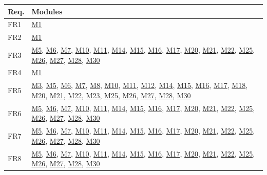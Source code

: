 \documentclass[12pt, titlepage]{article}
\begin{document}
\begin{table}[H]
\centering
\begin{tabular}{p{} p{}}
\toprule
\textbf{Req.} & \textbf{Modules}\\
\midrule
FR1 & \hyperref[m1]{M1}\\
FR2 & \hyperref[m1]{M1}\\ 
FR3 & \hyperref[m5]{M5}, \hyperref[m6]{M6}, \hyperref[m7]{M7}, \hyperref[m10]{M10}, \hyperref[m11]{M11}, \hyperref[m14]{M14}, \hyperref[m15]{M15}, \hyperref[m16]{M16}, \hyperref[m17]{M17}, \hyperref[m20]{M20}, \hyperref[m21]{M21}, \hyperref[m22]{M22}, \hyperref[m25]{M25}, \hyperref[m26]{M26}, \hyperref[m27]{M27}, \hyperref[m28]{M28}, \hyperref[m30]{M30} \\
FR4 & \hyperref[m1]{M1}\\
FR5 & \hyperref[m3]{M3}, \hyperref[m5]{M5}, \hyperref[m6]{M6}, \hyperref[m7]{M7}, \hyperref[m8]{M8}, \hyperref[m10]{M10}, \hyperref[m11]{M11}, \hyperref[m12]{M12}, \hyperref[m14]{M14}, \hyperref[m15]{M15}, \hyperref[m16]{M16}, \hyperref[m17]{M17}, \hyperref[m18]{M18}, \hyperref[m20]{M20}, \hyperref[m21]{M21}, \hyperref[m22]{M22}, \hyperref[m23]{M23}, \hyperref[m25]{M25}, \hyperref[m26]{M26}, \hyperref[m27]{M27}, \hyperref[m28]{M28}, \hyperref[m30]{M30}\\
FR6 & \hyperref[m5]{M5}, \hyperref[m6]{M6}, \hyperref[m7]{M7}, \hyperref[m10]{M10}, \hyperref[m11]{M11}, \hyperref[m14]{M14}, \hyperref[m15]{M15}, \hyperref[m16]{M16}, \hyperref[m17]{M17}, \hyperref[m20]{M20}, \hyperref[m21]{M21}, \hyperref[m22]{M22}, \hyperref[m25]{M25}, \hyperref[m26]{M26}, \hyperref[m27]{M27}, \hyperref[m28]{M28}, \hyperref[m30]{M30}\\
FR7 & \hyperref[m5]{M5}, \hyperref[m6]{M6}, \hyperref[m7]{M7}, \hyperref[m10]{M10}, \hyperref[m11]{M11}, \hyperref[m14]{M14}, \hyperref[m15]{M15}, \hyperref[m16]{M16}, \hyperref[m17]{M17}, \hyperref[m20]{M20}, \hyperref[m21]{M21}, \hyperref[m22]{M22}, \hyperref[m25]{M25}, \hyperref[m26]{M26}, \hyperref[m27]{M27}, \hyperref[m28]{M28}, \hyperref[m30]{M30}\\
FR8 & \hyperref[m5]{M5}, \hyperref[m6]{M6}, \hyperref[m7]{M7}, \hyperref[m10]{M10}, \hyperref[m11]{M11}, \hyperref[m14]{M14}, \hyperref[m15]{M15}, \hyperref[m16]{M16}, \hyperref[m17]{M17}, \hyperref[m20]{M20}, \hyperref[m21]{M21}, \hyperref[m22]{M22}, \hyperref[m25]{M25}, \hyperref[m26]{M26}, \hyperref[m27]{M27}, \hyperref[m28]{M28}, \hyperref[m30]{M30}\\

\end{tabular}
\end{table}
\end{document}
